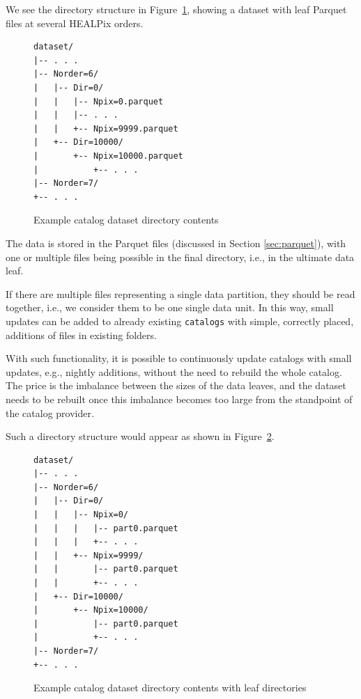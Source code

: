 \documentclass[11pt,a4paper]{ivoa}
\begin{document}
We see the directory structure in Figure~\ref{fig:datasetWithLeaf}, showing a dataset with leaf Parquet files at several HEALPix orders.

\begin{figure}
\begin{minipage}{\linewidth}
\begin{lstlisting}
dataset/
|-- . . .
|-- Norder=6/
|   |-- Dir=0/
|   |   |-- Npix=0.parquet
|   |   |-- . . .
|   |   +-- Npix=9999.parquet
|   +-- Dir=10000/
|       +-- Npix=10000.parquet
|           +-- . . .
|-- Norder=7/
+-- . . .
\end{lstlisting} 
\end{minipage}
\caption{Example catalog dataset directory contents}
\label{fig:datasetWithLeaf}
\end{figure}

The data is stored in the Parquet files (discussed in Section \ref{sec:parquet}), with one or multiple files being possible in the final directory, i.e., in the ultimate data leaf.  \par 
If there are multiple files representing a single data partition, they should be read together, i.e., we consider them to be one single data unit. In this way, small updates can be added to already existing  \texttt{catalogs} with simple, correctly placed, additions of files in existing folders. \par 
With such functionality, it is possible to continuously update catalogs with small updates, e.g., nightly additions, without the need to rebuild the whole catalog. The price is the imbalance between the sizes of the data leaves, and the dataset needs to be rebuilt once this imbalance becomes too large from the standpoint of the catalog provider.


Such a directory structure would appear as shown in Figure~\ref{fig:datasetWithDir}.

\begin{figure}
\begin{minipage}{\linewidth}
\begin{lstlisting}
dataset/
|-- . . .
|-- Norder=6/
|   |-- Dir=0/
|   |   |-- Npix=0/
|   |   |   |-- part0.parquet
|   |   |   +-- . . .
|   |   +-- Npix=9999/
|   |       |-- part0.parquet
|   |       +-- . . .
|   +-- Dir=10000/
|       +-- Npix=10000/
|           |-- part0.parquet
|           +-- . . .
|-- Norder=7/
+-- . . .
\end{lstlisting} 
\end{minipage} 
\caption{Example catalog dataset directory contents with leaf directories }
\label{fig:datasetWithDir}
\end{figure}
\end{document}
